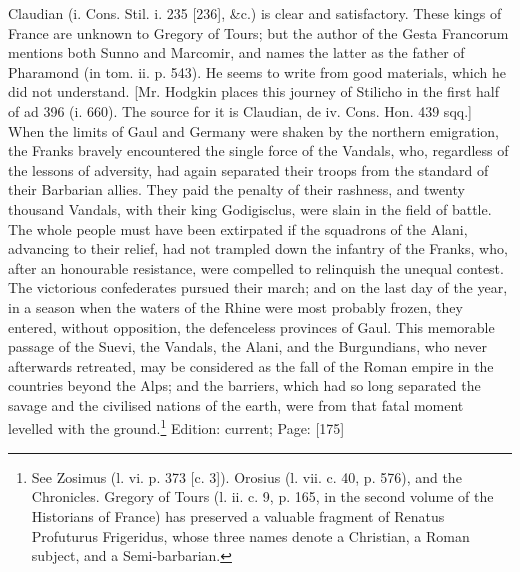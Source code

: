 {Claudian (i. Cons. Stil. i. 235 [236], \&c.) is clear and satisfactory. These kings of France are unknown to Gregory of Tours; but the author of the Gesta Francorum mentions both Sunno and Marcomir, and names the latter as the father of Pharamond (in tom. ii. p. 543). He seems to write from good materials, which he did not understand. [Mr. Hodgkin places this journey of Stilicho in the first half of ad 396 (i. 660). The source for it is Claudian, de iv. Cons. Hon. 439 sqq.]} When the limits of Gaul and Germany were shaken by the northern emigration, the Franks bravely encountered the single force of the Vandals, who, regardless of the lessons of adversity, had again separated their troops from the standard of their Barbarian allies. They paid the penalty of their rashness, and twenty thousand Vandals, with their king Godigisclus, were slain in the field of battle. The whole people must have been extirpated if the squadrons of the Alani, advancing to their relief, had not trampled down the infantry of the Franks, who, after an honourable resistance, were compelled to relinquish the unequal contest. The victorious confederates pursued their march; and on the last day of the year, in a season when the waters of the Rhine were most probably frozen, they entered, without opposition, the defenceless provinces of Gaul. This memorable passage of the Suevi, the Vandals, the Alani, and the Burgundians, who never afterwards retreated, may be considered as the fall of the Roman empire in the countries beyond the Alps; and the barriers, which had so long separated the savage and the civilised nations of the earth, were from that fatal moment levelled with the ground.\footnote{See Zosimus (l. vi. p. 373 [c. 3]). Orosius (l. vii. c. 40, p. 576), and the Chronicles. Gregory of Tours (l. ii. c. 9, p. 165, in the second volume of the Historians of France) has preserved a valuable fragment of Renatus Profuturus Frigeridus, whose three names denote a Christian, a Roman subject, and a Semi-barbarian.}
Edition: current; Page: [175]

